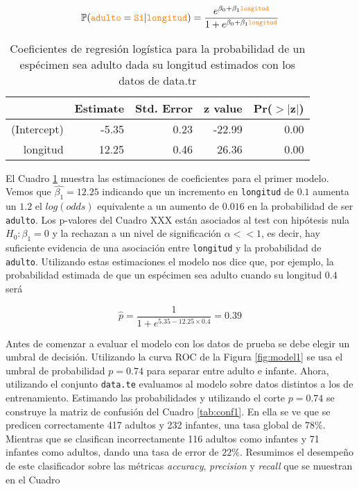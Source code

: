 \documentclass[a4paper]{article}\usepackage[]{graphicx}\usepackage[]{color}
\begin{document}
\begin{equation}
\mathbb P(\texttt{\textcolor{BurntOrange}{adulto}} = \texttt{\textcolor{BurntOrange}{Sí}} | \texttt{\textcolor{BurntOrange}{longitud}}) = \frac{e^{\beta_0 + \beta_1\texttt{\textcolor{BurntOrange}{longitud}}}}{1+e^{\beta_0 + \beta_1\texttt{\textcolor{BurntOrange}{longitud}}}}
\end{equation}


\begin{table}[ht]
\centering
\begin{tabular}{rrrrr}
  \hline
 & Estimate & Std. Error & z value & Pr($>$$|$z$|$) \\ 
  \hline
(Intercept) & -5.35 & 0.23 & -22.99 & 0.00 \\ 
  longitud & 12.25 & 0.46 & 26.36 & 0.00 \\ 
   \hline
\end{tabular}
\caption{Coeficientes de regresión logística para la probabilidad de un espécimen sea adulto dada su longitud estimados con los datos de data.tr} 
\label{tab:model1}
\end{table}


El Cuadro \ref{tab:model1} muestra las estimaciones de coeficientes para el primer modelo. Vemos que $\hat{\beta_1}=12.25$ indicando que un incremento en \texttt{\textcolor{BurntOrange}{longitud}} de $0.1$ aumenta un $1.2$ el $log(odds)$ equivalente a un aumento de $0.016$ en la probabilidad de ser \texttt{\textcolor{BurntOrange}{adulto}}. Los p-valores del Cuadro XXX están asociados al test con hipótesis nula $H_0: \beta_1=0$ y la rechazan a un nivel de significación $\alpha << 1$, es decir, hay suficiente evidencia de una asociación entre \texttt{\textcolor{BurntOrange}{longitud}} y la probabilidad de \texttt{\textcolor{BurntOrange}{adulto}}. Utilizando estas estimaciones el modelo nos dice que, por ejemplo, la probabilidad estimada de que un espécimen sea adulto cuando su longitud $0.4$ será

\begin{equation}
\hat{p} = \frac{1}{1+e^{5.35-12.25\times0.4}} = 0.39
\end{equation} 

Antes de comenzar a evaluar el modelo con los datos de prueba se debe elegir un umbral de decisión. Utilizando la curva ROC de la Figura \ref{fig:model1} se usa el umbral de probabilidad $p=0.74$ para separar entre adulto e infante. Ahora, utilizando el conjunto \texttt{\textcolor{BurntOrange}{data.te}} evaluamos al modelo sobre datos distintos a los de entrenamiento. Estimando las probabilidades y utilizando el corte $p=0.74$ se construye la matriz de confusión del Cuadro \ref{tab:conf1}. En ella se ve que se predicen correctamente 417 adultos y 232 infantes, una tasa global de $78\%$. Mientras que se clasifican incorrectamente 116 adultos como infantes y 71 infantes como adultos, dando una tasa de error de $22\%$. Resumimos el desempeño de este clasificador sobre las métricas \textit{accuracy}, \textit{precision} y \textit{recall} que se muestran en el Cuadro
\end{document}
